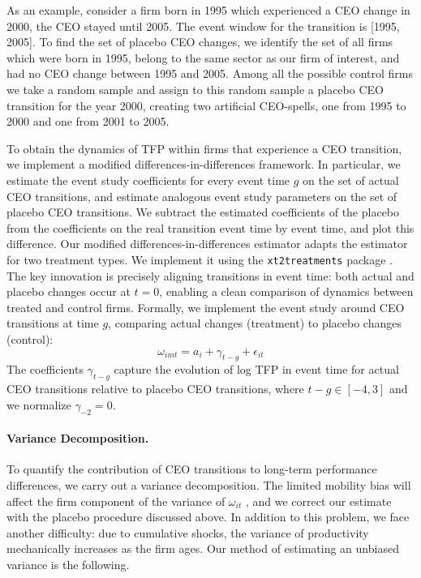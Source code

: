 \documentclass[11pt,a4paper]{article}
\begin{document}
As an example, consider a firm born in 1995 which experienced a CEO change in 2000, the CEO stayed until 2005. The event window for the transition is [1995, 2005]. To find the set of placebo CEO changes, we identify the set of all firms which were born in 1995, belong to the same sector as our firm of interest, and had no CEO change between 1995 and 2005. Among all the possible control firms we take a random sample and assign to this random sample a placebo CEO transition for the year 2000, creating two artificial CEO-spells, one from 1995 to 2000 and one from 2001 to 2005.

To obtain the dynamics of TFP within firms that experience a CEO transition, we implement a modified differences-in-differences framework. In particular, we estimate the event study coefficients for every event time $g$ on the set of actual CEO transitions, and estimate analogous event study parameters on the set of placebo CEO transitions. We subtract the estimated coefficients of the placebo from the coefficients on the real transition event time by event time, and plot this difference. Our modified differences-in-differences estimator adapts the \citet{Callaway2021JoLE} estimator for two treatment types. We implement it using the \texttt{xt2treatments} package \citep{Koren2024xt2treatments}. The key innovation is precisely aligning transitions in event time: both actual and placebo changes occur at $t=0$, enabling a clean comparison of dynamics between treated and control firms. 
Formally, we implement the event study around CEO transitions at time $g$, comparing actual changes (treatment) to placebo changes (control):
\begin{equation}
\omega_{imt} = a_i + \gamma_{t-g} + \epsilon_{it}
\end{equation}
The coefficients $\gamma_{t-g}$ capture the evolution of log TFP in event time for actual CEO transitions relative to placebo CEO transitions, where $t-g \in [-4, 3]$ and we normalize $\gamma_{-2} = 0$. 


\paragraph{Variance Decomposition.} To quantify the contribution of CEO transitions to long-term performance differences, we carry out a variance decomposition. The limited mobility bias will affect the firm component of the variance of $\omega_{it}$ \citep{kline2024firm}, and we correct our estimate with the placebo procedure discussed above. In addition to this problem, we face another difficulty: due to cumulative shocks, the variance of productivity mechanically increases as the firm ages. Our method of estimating an unbiased variance is the following.
\end{document}
